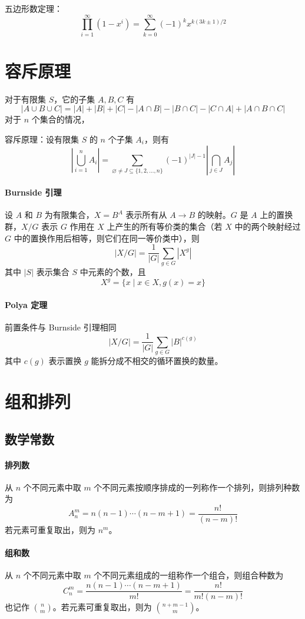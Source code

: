 \documentclass{probook}
\begin{document}
\begin{multicols}{2}
五边形数定理：
\[ \prod_{i=1}^\infty (1-x^i) = \sum_{k=0}^{\infty} (-1)^k x^{k(3k \pm 1) /2} \]



\section{容斥原理}

对于有限集 $S$，它的子集 $A,B,C$ 有
\[ |A \cup B \cup C| = |A| + |B| + |C| - |A\cap B| - |B \cap C| - |C \cap A| + |A \cap B \cap C| \]
对于 $n$ 个集合的情况，

容斥原理：设有限集 $S$ 的 $n$ 个子集 $A_i$，则有
\[ \left|\bigcup _{i=1}^{n}A_{i}\right|=\sum _{\varnothing \neq J\subseteq \{1,2,\ldots ,n\}}(-1)^{|J|-1}\left| \bigcap _{j\in J}A_{j} \right| \]

\paragraph{Burnside 引理}
设 $A$ 和 $B$ 为有限集合，$X=B^A$ 表示所有从 $A \to B$ 的映射。$G$ 是 $A$ 上的置换群，$X/G$ 表示 $G$ 作用在 $X$ 上产生的所有等价类的集合（若 $X$ 中的两个映射经过 $G$ 中的置换作用后相等，则它们在同一等价类中），则
\[ |X/G|=\frac{1}{|G|}\sum_{g\in G}|X^g| \]
其中 $|S|$ 表示集合 $S$ 中元素的个数，且
\[ X^g = \{ x \mid x \in X,g(x) = x \} \]

\paragraph{Polya 定理}
前置条件与 Burnside 引理相同
\[ |X/G|=\frac{1}{|G|}\sum_{g\in G}|B|^{c(g)} \]
其中 $c(g)$ 表示置换 $g$ 能拆分成不相交的循环置换的数量。

\section{组和排列}

\subsection{数学常数}

\paragraph{排列数}
从 $n$ 个不同元素中取 $m$ 个不同元素按顺序排成的一列称作一个排列，则排列种数为 
\[ A_n^m = n(n-1)\cdots (n-m+1) = \frac{n!}{(n-m)!} \]
若元素可重复取出，则为 $n^m$。

\paragraph{组和数}
从 $n$ 个不同元素中取 $m$ 个不同元素组成的一组称作一个组合，则组合种数为
\[ C_n^m = \frac{n(n-1)\cdots(n-m+1)}{m!} = \frac{n!}{m!(n-m)!} \]
也记作 $\binom{n}{m}$。若元素可重复取出，则为 $\binom{n+m-1}{m}$。


\end{multicols}
\end{document}
